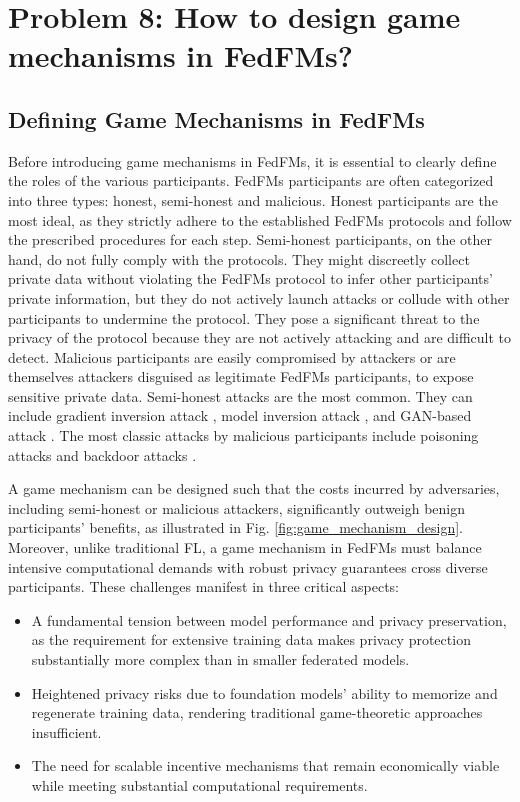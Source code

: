\section{
Problem 8: How to design game mechanisms in FedFMs?
}
\label{game_mechanism}

\subsection{Defining Game Mechanisms in FedFMs}
Before introducing game mechanisms in FedFMs, it is essential to clearly define the roles of the various participants. FedFMs participants are often categorized into three types: honest, semi-honest and malicious. Honest participants are the most ideal, as they strictly adhere to the established FedFMs protocols and follow the prescribed procedures for each step. Semi-honest participants, on the other hand, do not fully comply with the protocols. They might discreetly collect private data without violating the FedFMs protocol to infer other participants’ private information, but they do not actively launch attacks or collude with other participants to undermine the protocol. They pose a significant threat to the privacy of the protocol because they are not actively attacking and are difficult to detect. 
Malicious participants are easily compromised by attackers or are themselves attackers disguised as legitimate FedFMs participants, to expose sensitive private data. Semi-honest attacks are the most common. They can include gradient inversion attack \cite{zhu2019deep,geiping2020inverting}, model inversion attack \cite{he2019model}, and GAN-based attack \cite{wang2019beyond}. The most classic attacks by malicious participants include poisoning attacks \cite{tolpegin2020data} and backdoor attacks \cite{gao2020backdoor,li2022backdoor}.

A game mechanism can be designed such that the costs incurred by adversaries, including semi-honest or malicious attackers, significantly outweigh benign participants' benefits, as illustrated in Fig. \ref{fig:game_mechanism_design}. Moreover, unlike traditional FL, a game mechanism in FedFMs must balance intensive computational demands with robust privacy guarantees cross diverse participants.
These challenges manifest in three critical aspects:
\begin{itemize}
\item A fundamental tension between model performance and privacy preservation, as the requirement for extensive training data makes privacy protection substantially more complex than in smaller federated models.
\item Heightened privacy risks due to foundation models' ability to memorize and regenerate training data, rendering traditional game-theoretic approaches insufficient.
\item The need for scalable incentive mechanisms that remain economically viable while meeting substantial computational requirements.
\end{itemize}

